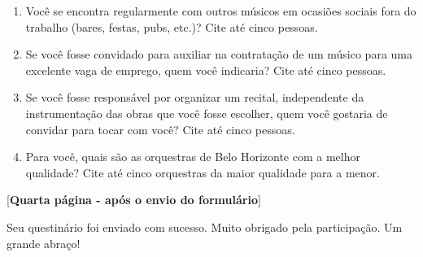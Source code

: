 \documentclass[a4paper, 12pt, openright, oneside, german, french, english, brazil]{abntex2}
\begin{document}
\begin{enumerate}
		\item Você se encontra regularmente com outros músicos em ocasiões sociais fora do trabalho (bares, festas, pubs, etc.)? Cite até cinco pessoas.



		\item Se você fosse convidado para auxiliar na contratação de um músico para uma excelente vaga de emprego, quem você indicaria? Cite até cinco pessoas.



		\item Se você fosse responsável por organizar um recital, independente da instrumentação das obras que você fosse escolher, quem você gostaria de convidar para tocar com você? Cite até cinco pessoas.

		\item Para você, quais são as orquestras de Belo Horizonte com a melhor qualidade? Cite até cinco orquestras da maior qualidade para a menor.


	\end{enumerate}





	[\textbf{Quarta página - após o envio do formulário}]



	Seu questinário foi enviado com sucesso. Muito obrigado pela participação. Um grande abraço!
\end{document}
